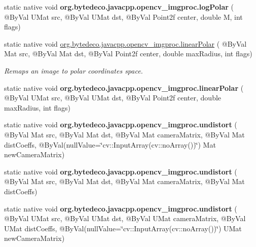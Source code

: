\begin{DoxyCompactItemize}
static native void {\bfseries org.\+bytedeco.\+javacpp.\+opencv\+\_\+imgproc.\+log\+Polar} ( @By\+Val U\+Mat src, @By\+Val U\+Mat dst, @By\+Val Point2f center, double M, int flags)
\item 
static native void \hyperlink{group__imgproc__transform_ga46939c6aff509b593336b89237a563d3}{org.\+bytedeco.\+javacpp.\+opencv\+\_\+imgproc.\+linear\+Polar} ( @By\+Val Mat src, @By\+Val Mat dst, @By\+Val Point2f center, double max\+Radius, int flags)
\begin{DoxyCompactList}\small\item\em Remaps an image to polar coordinates space. \end{DoxyCompactList}\item 
\mbox{\label{group__imgproc__transform_ga3ed1a74dc7f5ba30d970b0d15630a743}} 
static native void {\bfseries org.\+bytedeco.\+javacpp.\+opencv\+\_\+imgproc.\+linear\+Polar} ( @By\+Val U\+Mat src, @By\+Val U\+Mat dst, @By\+Val Point2f center, double max\+Radius, int flags)
\item 
\mbox{\label{group__imgproc__transform_ga375e610285062a3a1180615b79a8ee94}} 
static native void {\bfseries org.\+bytedeco.\+javacpp.\+opencv\+\_\+imgproc.\+undistort} ( @By\+Val Mat src, @By\+Val Mat dst, @By\+Val Mat camera\+Matrix, @By\+Val Mat dist\+Coeffs, @By\+Val(null\+Value=\char`\"{}cv\+::\+Input\+Array(cv\+::no\+Array())\char`\"{}) Mat new\+Camera\+Matrix)
\item 
\mbox{\label{group__imgproc__transform_ga3d825d65865c08b96997a987ee8811ce}} 
static native void {\bfseries org.\+bytedeco.\+javacpp.\+opencv\+\_\+imgproc.\+undistort} ( @By\+Val Mat src, @By\+Val Mat dst, @By\+Val Mat camera\+Matrix, @By\+Val Mat dist\+Coeffs)
\item 
\mbox{\label{group__imgproc__transform_ga4ff2e21ddf10fb824ac7ee240ed14dc9}} 
static native void {\bfseries org.\+bytedeco.\+javacpp.\+opencv\+\_\+imgproc.\+undistort} ( @By\+Val U\+Mat src, @By\+Val U\+Mat dst, @By\+Val U\+Mat camera\+Matrix, @By\+Val U\+Mat dist\+Coeffs, @By\+Val(null\+Value=\char`\"{}cv\+::\+Input\+Array(cv\+::no\+Array())\char`\"{}) U\+Mat new\+Camera\+Matrix)
\item 
\mbox{\label{group__imgproc__transform_ga44c9df70a2d7536c2db561663fdf27ce}} 

\end{DoxyCompactItemize}
